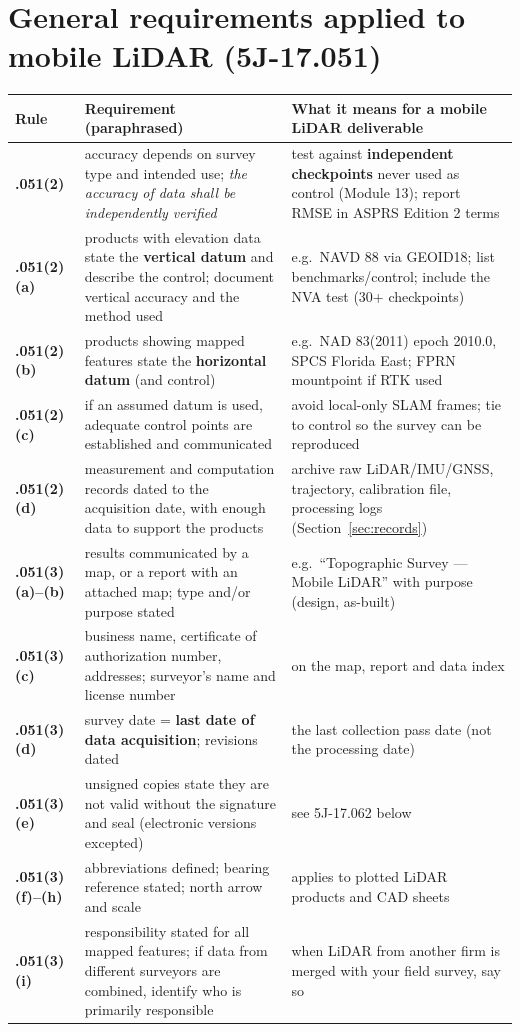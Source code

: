 \section{General requirements applied to mobile LiDAR (5J-17.051)}
\begin{center}\small
\renewcommand{\arraystretch}{1.22}
\begin{tabularx}{\linewidth}{>{\bfseries}p{1.9cm}>{\raggedright\arraybackslash}p{4.6cm}X}\toprule
Rule & Requirement (paraphrased) & What it means for a mobile LiDAR deliverable\\\midrule
.051(2) & accuracy depends on survey type and intended use; \emph{the accuracy of data shall be independently verified} & test against \textbf{independent checkpoints} never used as control (Module 13); report RMSE in ASPRS Edition 2 terms\\
.051(2)(a) & products with elevation data state the \textbf{vertical datum} and describe the control; document vertical accuracy and the method used & e.g.\ NAVD 88 via GEOID18; list benchmarks/control; include the NVA test (30+ checkpoints)\\
.051(2)(b) & products showing mapped features state the \textbf{horizontal datum} (and control) & e.g.\ NAD 83(2011) epoch 2010.0, SPCS Florida East; FPRN mountpoint if RTK used\\
.051(2)(c) & if an assumed datum is used, adequate control points are established and communicated & avoid local-only SLAM frames; tie to control so the survey can be reproduced\\
.051(2)(d) & measurement and computation records dated to the acquisition date, with enough data to support the products & archive raw LiDAR/IMU/GNSS, trajectory, calibration file, processing logs (Section~\ref{sec:records})\\
.051(3)(a)--(b) & results communicated by a map, or a report with an attached map; type and/or purpose stated & e.g.\ ``Topographic Survey --- Mobile LiDAR'' with purpose (design, as-built)\\
.051(3)(c) & business name, certificate of authorization number, addresses; surveyor's name and license number & on the map, report and data index\\
.051(3)(d) & survey date = \textbf{last date of data acquisition}; revisions dated & the last collection pass date (not the processing date)\\
.051(3)(e) & unsigned copies state they are not valid without the signature and seal (electronic versions excepted) & see 5J-17.062 below\\
.051(3)(f)--(h) & abbreviations defined; bearing reference stated; north arrow and scale & applies to plotted LiDAR products and CAD sheets\\
.051(3)(i) & responsibility stated for all mapped features; if data from different surveyors are combined, identify who is primarily responsible & when LiDAR from another firm is merged with your field survey, say so\\\bottomrule
\end{tabularx}\end{center}

